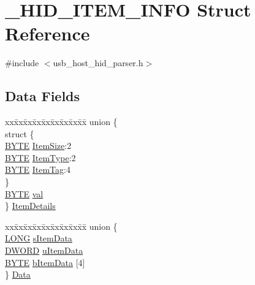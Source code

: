 \hypertarget{struct___h_i_d___i_t_e_m___i_n_f_o}{}\section{\+\_\+\+H\+I\+D\+\_\+\+I\+T\+E\+M\+\_\+\+I\+N\+F\+O Struct Reference}
\label{struct___h_i_d___i_t_e_m___i_n_f_o}


{\ttfamily \#include $<$usb\+\_\+host\+\_\+hid\+\_\+parser.\+h$>$}

\subsection*{Data Fields}
\begin{DoxyCompactItemize}
\item 
\begin{tabbing}
xx\=xx\=xx\=xx\=xx\=xx\=xx\=xx\=xx\=\kill
union \{\\
\>struct \{\\
\>\>\hyperlink{_generic_type_defs_8h_a4ae1dab0fb4b072a66584546209e7d58}{BYTE} \hyperlink{struct___h_i_d___i_t_e_m___i_n_f_o_aaf0f74e266d95f2ea6d5d563b59aad40}{ItemSize}:2\\
\>\>\hyperlink{_generic_type_defs_8h_a4ae1dab0fb4b072a66584546209e7d58}{BYTE} \hyperlink{struct___h_i_d___i_t_e_m___i_n_f_o_a7dca8297adff54a962a670360d023ce7}{ItemType}:2\\
\>\>\hyperlink{_generic_type_defs_8h_a4ae1dab0fb4b072a66584546209e7d58}{BYTE} \hyperlink{struct___h_i_d___i_t_e_m___i_n_f_o_a3efd051d2bb790b9eb93426966fd12ff}{ItemTag}:4\\
\>\} \\
\>\hyperlink{_generic_type_defs_8h_a4ae1dab0fb4b072a66584546209e7d58}{BYTE} \hyperlink{struct___h_i_d___i_t_e_m___i_n_f_o_a5986ea8162aa0f6608b36b20964044dd}{val}\\
\} \hyperlink{struct___h_i_d___i_t_e_m___i_n_f_o_aa28955a76b87526851d10185418ed489}{ItemDetails}\\

\end{tabbing}\item 
\begin{tabbing}
xx\=xx\=xx\=xx\=xx\=xx\=xx\=xx\=xx\=\kill
union \{\\
\>\hyperlink{_generic_type_defs_8h_a73a5fec9b19159a6647fbf000017b221}{LONG} \hyperlink{struct___h_i_d___i_t_e_m___i_n_f_o_a2aa105276c0a0071288e43b964397dde}{sItemData}\\
\>\hyperlink{_generic_type_defs_8h_ad342ac907eb044443153a22f964bf0af}{DWORD} \hyperlink{struct___h_i_d___i_t_e_m___i_n_f_o_af6b89a9709626b8a41077c9fa0a671f0}{uItemData}\\
\>\hyperlink{_generic_type_defs_8h_a4ae1dab0fb4b072a66584546209e7d58}{BYTE} \hyperlink{struct___h_i_d___i_t_e_m___i_n_f_o_a6e652f371bf24a65ec092f6e5ab93b8c}{bItemData} \mbox{[}4\mbox{]}\\
\} \hyperlink{struct___h_i_d___i_t_e_m___i_n_f_o_aab5978951f19c7ce4025917a9b9e68e2}{Data}\\

\end{tabbing}\end{DoxyCompactItemize}


